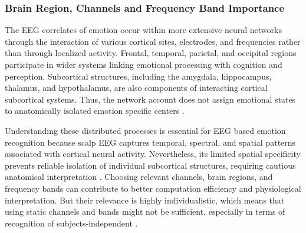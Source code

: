 \documentclass[ASNA,twocolumn]{USG}
\begin{document}
\subsubsection{Brain Region, Channels and Frequency Band Importance}
\label{sssec:brain_region_channel_band_importance}

The EEG correlates of emotion occur within more extensive neural networks through the interaction of various cortical sites, electrodes, and frequencies rather than through localized activity. Frontal, temporal, parietal, and occipital regions participate in wider systems linking emotional processing with cognition and perception. Subcortical structures, including the amygdala, hippocampus, thalamus, and hypothalamus, are also components of interacting cortical subcortical systems. Thus, the network account does not assign emotional states to anatomically isolated emotion specific centers \cite{pessoa2017network}.

Understanding these distributed processes is essential for EEG based emotion recognition because scalp EEG captures temporal, spectral, and spatial patterns associated with cortical neural activity. Nevertheless, its limited spatial specificity prevents reliable isolation of individual subcortical structures, requiring cautious anatomical interpretation \cite{cohen2017does}. Choosing relevant channels, brain regions, and frequency bands can contribute to better computation efficiency and physiological interpretation. But their relevance is highly individualistic, which means that using static channels and bands might not be sufficient, especially in terms of recognition of subjects-independent \cite{yang2024automatically}.
\end{document}
